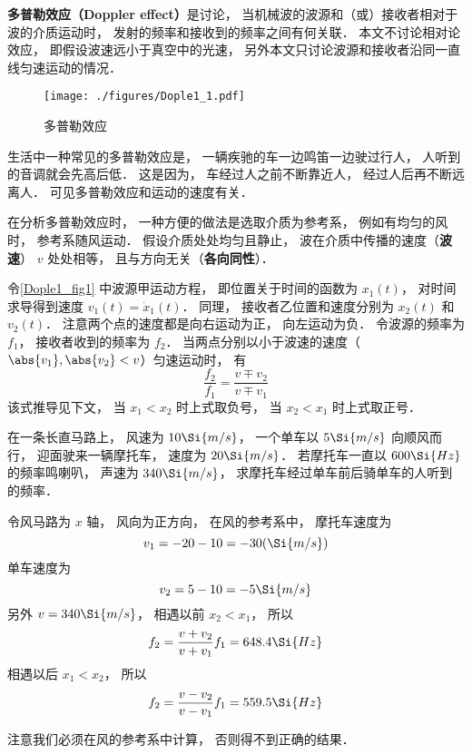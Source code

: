 

\textbf{多普勒效应（Doppler effect）}是讨论， 当机械波的波源和（或）接收者相对于波的介质运动时， 发射的频率和接收到的频率之间有何关联． 本文不讨论相对论效应， 即假设波速远小于真空中的光速， 另外本文只讨论波源和接收者沿同一直线匀速运动的情况．

\begin{figure}[ht]
\centering
\texttt{[image: ./figures/Dople1\_1.pdf]}
\caption{多普勒效应} \label{Dople1_fig1}
\end{figure}

\begin{example}{}
生活中一种常见的多普勒效应是， 一辆疾驰的车一边鸣笛一边驶过行人， 人听到的音调就会先高后低． 这是因为， 车经过人之前不断靠近人， 经过人后再不断远离人． 可见多普勒效应和运动的速度有关．
\end{example}

在分析多普勒效应时， 一种方便的做法是选取介质为参考系， 例如有均匀的风时， 参考系随风运动． 假设介质处处均匀且静止， 波在介质中传播的速度（\textbf{波速}） $v$ 处处相等， 且与方向无关（\textbf{各向同性}）．

令\autoref{Dople1_fig1} 中波源甲运动方程， 即位置关于时间的函数为 $x_1(t)$， 对时间求导得到速度 $v_1(t) = \dot{x}_1(t)$． 同理， 接收者乙位置和速度分别为 $x_2(t)$ 和 $v_2(t)$． 注意两个点的速度都是向右运动为正， 向左运动为负． 令波源的频率为 $f_1$， 接收者收到的频率为 $f_2$． 当两点分别以小于波速的速度（$\abs{v_1}, \abs{v_2} < v$）匀速运动时， 有
\begin{equation}\label{Dople1_eq1}
\frac{f_2}{f_1} = \frac{v \mp v_2}{v \mp v_1}
\end{equation}
该式推导见下文， 当 $x_1 < x_2$ 时上式取负号， 当 $x_2 < x_1$ 时上式取正号．

\begin{exercise}{}
在一条长直马路上， 风速为 $10\Si{m/s}$， 一个单车以 $5\Si{m/s}$ 向顺风而行， 迎面驶来一辆摩托车， 速度为 $20\Si{m/s}$． 若摩托车一直以 $600\Si{Hz}$ 的频率鸣喇叭， 声速为 $340\Si{m/s}$， 求摩托车经过单车前后骑单车的人听到的频率．

令风马路为 $x$ 轴， 风向为正方向， 在风的参考系中， 摩托车速度为
\begin{equation}
v_1 = -20 - 10 = -30(\Si{m/s})
\end{equation}
单车速度为
\begin{equation}
v_2 = 5 - 10 = -5\Si{m/s}
\end{equation}
另外 $v = 340\Si{m/s}$， 相遇以前 $x_2 < x_1$， 所以
\begin{equation}
f_2 = \frac{v + v_2}{v + v_1} f_1 = 648.4\Si{Hz}
\end{equation}
相遇以后 $x_1 < x_2$， 所以
\begin{equation}
f_2 = \frac{v - v_2}{v - v_1} f_1 = 559.5\Si{Hz}
\end{equation}
\end{exercise}
注意我们必须在风的参考系中计算， 否则得不到正确的结果．

